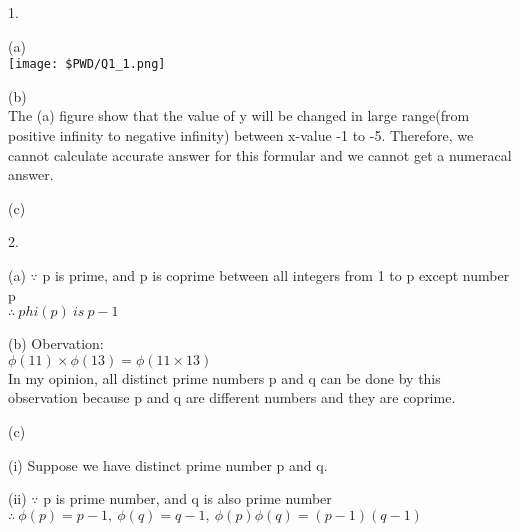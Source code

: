 \documentclass{article}
\begin{document}
  \begin{enumerate*}
    \item [1.]
    \begin{enumerate*}  
      \item [(a)] \text{}\\
      \texttt{[image: \$PWD/Q1\_1.png]}

	  \item [(b)] \text{}\\ 
      The (a) figure show that the value of y will be changed in large range(from positive infinity to negative infinity) between x-value -1 to -5. Therefore, we cannot calculate accurate answer for this formular and we cannot get a numeracal answer.
      
      \item [(c)] \text{}\\ 

    \end{enumerate*}
    
    \item [2.]
    \begin{enumerate*}
      \item [(a)]
      $\because$ p is prime, and p is coprime between all integers from 1 to p except number p \\
      $\therefore \ phi(p)\ is\ p-1$ 
      
      \item [(b)]
      Obervation: \\
      $\phi(11) \times \phi(13) = \phi(11 \times 13)$ \\
      In my opinion, all distinct prime numbers p and q can be done by this observation because p and q are different numbers and they are coprime.
      
      \item [(c)]
        \ 
        \begin{enumerate*}
          \item [(i)]
          Suppose we have distinct prime number p and q.
          \\

          \item [(ii)]
          $\because$ p is prime number, and q is also prime number \\
          $\therefore\ \phi(p) = p-1,\ \phi(q) = q-1,\ \phi(p)\phi(q)=(p-1)(q-1)$
          \\


\end{enumerate*}
\end{enumerate*}
\end{enumerate*}
\end{document}
